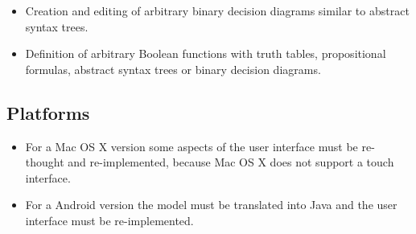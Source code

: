 \begin{itemize}

\item Creation and editing of arbitrary binary decision diagrams similar to abstract syntax trees.

\item Definition of arbitrary Boolean functions with truth tables, propositional formulas, abstract syntax trees or binary decision diagrams.

\end{itemize}


\subsection{Platforms}
\begin{itemize}

\item For a Mac OS X version some aspects of the user interface must be re-thought and re-implemented, 
because Mac OS X does not support a touch interface.

\item For a Android version the model must be translated into Java and the user interface must be re-implemented.



\end{itemize}





